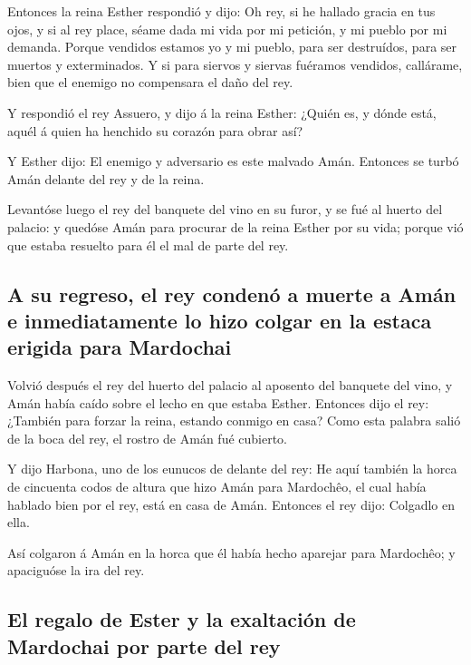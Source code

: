  Entonces la reina Esther respondió y dijo: Oh rey, si he
hallado gracia en tus ojos, y si al rey place, séame dada mi vida por mi
petición, y mi pueblo por mi demanda.  Porque vendidos
estamos yo y mi pueblo, para ser destruídos, para ser muertos y
exterminados. Y si para siervos y siervas fuéramos vendidos, callárame,
bien que el enemigo no compensara el daño del rey.

 Y respondió el rey Assuero, y dijo á la reina Esther:
¿Quién es, y dónde está, aquél á quien ha henchido su corazón para obrar
así?

 Y Esther dijo: El enemigo y adversario es este malvado
Amán. Entonces se turbó Amán delante del rey y de la reina.

 Levantóse luego el rey del banquete del vino en su furor,
y se fué al huerto del palacio: y quedóse Amán para procurar de la reina
Esther por su vida; porque vió que estaba resuelto para él el mal de
parte del rey.

\hypertarget{a-su-regreso-el-rey-condenuxf3-a-muerte-a-amuxe1n-e-inmediatamente-lo-hizo-colgar-en-la-estaca-erigida-para-mardochai}{%
\subsection{A su regreso, el rey condenó a muerte a Amán e
inmediatamente lo hizo colgar en la estaca erigida para
Mardochai}\label{a-su-regreso-el-rey-condenuxf3-a-muerte-a-amuxe1n-e-inmediatamente-lo-hizo-colgar-en-la-estaca-erigida-para-mardochai}}

 Volvió después el rey del huerto del palacio al aposento
del banquete del vino, y Amán había caído sobre el lecho en que estaba
Esther. Entonces dijo el rey: ¿También para forzar la reina, estando
conmigo en casa? Como esta palabra salió de la boca del rey, el rostro
de Amán fué cubierto.

 Y dijo Harbona, uno de los eunucos de delante del rey: He
aquí también la horca de cincuenta codos de altura que hizo Amán para
Mardochêo, el cual había hablado bien por el rey, está en casa de Amán.
Entonces el rey dijo: Colgadlo en ella.

 Así colgaron á Amán en la horca que él había hecho
aparejar para Mardochêo; y apaciguóse la ira del rey.

\hypertarget{el-regalo-de-ester-y-la-exaltaciuxf3n-de-mardochai-por-parte-del-rey}{%
\subsection{El regalo de Ester y la exaltación de Mardochai por parte
del
rey}\label{el-regalo-de-ester-y-la-exaltaciuxf3n-de-mardochai-por-parte-del-rey}}

